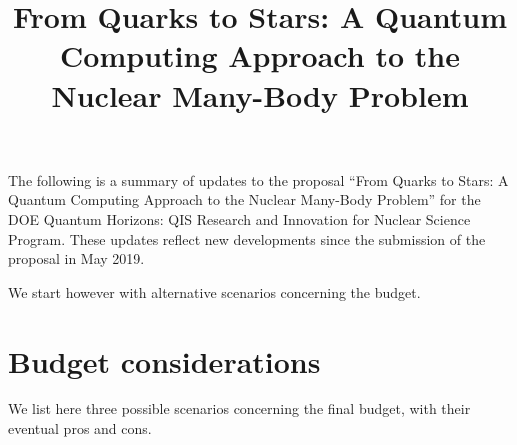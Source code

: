 \documentclass[11pt]{article}
\begin{document}
\title{From Quarks to Stars:  A Quantum Computing Approach to the Nuclear Many-Body Problem}

\maketitle

\noindent The following is a summary of updates to the proposal ``From Quarks to Stars:  A Quantum Computing Approach to the Nuclear Many-Body Problem'' for the DOE Quantum Horizons: QIS Research and Innovation for Nuclear Science Program.  These updates reflect new developments since the submission of the proposal in May 2019.

We start however with alternative scenarios concerning the budget.

\section{Budget considerations}
We list here three possible scenarios concerning the final budget, with their eventual pros and cons.
\end{document}
